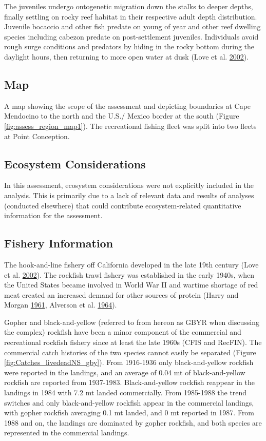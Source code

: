 \documentclass[12pt,]{article}
\begin{document}
The juveniles undergo ontogenetic migration down the stalks to deeper
depths, finally settling on rocky reef habitat in their respective adult
depth distribution. Juvenile bocaccio and other fish predate on young of
year and other reef dwelling species including cabezon predate on
post-settlement juveniles. Individuals avoid rough surge conditions and
predators by hiding in the rocky bottom during the daylight hours, then
returning to more open water at dusk (Love et al.
\protect\hyperlink{ref-Love2002}{2002}).

\subsection{Map}\label{map}

A map showing the scope of the assessment and depicting boundaries at
Cape Mendocino to the north and the U.S./ Mexico border at the south
(Figure \ref{fig:assess_region_map1}). The recreational fishing fleet
was split into two fleets at Point Conception.

\subsection{Ecosystem Considerations}\label{ecosystem-considerations-1}

In this assessment, ecosystem considerations were not explicitly
included in the analysis. This is primarily due to a lack of relevant
data and results of analyses (conducted elsewhere) that could contribute
ecosystem-related quantitative information for the assessment.

\subsection{Fishery Information}\label{fishery-information}

The hook-and-line fishery off California developed in the late 19th
century (Love et al. \protect\hyperlink{ref-Love2002}{2002}). The
rockfish trawl fishery was established in the early 1940s, when the
United States became involved in World War II and wartime shortage of
red meat created an increased demand for other sources of protein (Harry
and Morgan \protect\hyperlink{ref-Harry1961}{1961}, Alverson et al.
\protect\hyperlink{ref-Alverson1964}{1964}).

Gopher and black-and-yellow (referred to from hereon as GBYR when
discussing the complex) rockfish have been a minor component of the
commercial and recreational rockfish fishery since at least the late
1960s (CFIS and RecFIN). The commercial catch histories of the two
species cannot easily be separated (Figure
\ref{fig:Catches_livedeadNS_gby}). From 1916-1936 only black-and-yellow
rockfish were reported in the landings, and an average of 0.04 mt of
black-and-yellow rockfish are reported from 1937-1983. Black-and-yellow
rockfish reappear in the landings in 1984 with 7.2 mt landed
commercially. From 1985-1988 the trend switches and only
black-and-yellow rockfish appear in the commercial landings, with gopher
rockfish averaging 0.1 mt landed, and 0 mt reported in 1987. From 1988
and on, the landings are dominated by gopher rockfish, and both species
are represented in the commercial landings.
\end{document}
